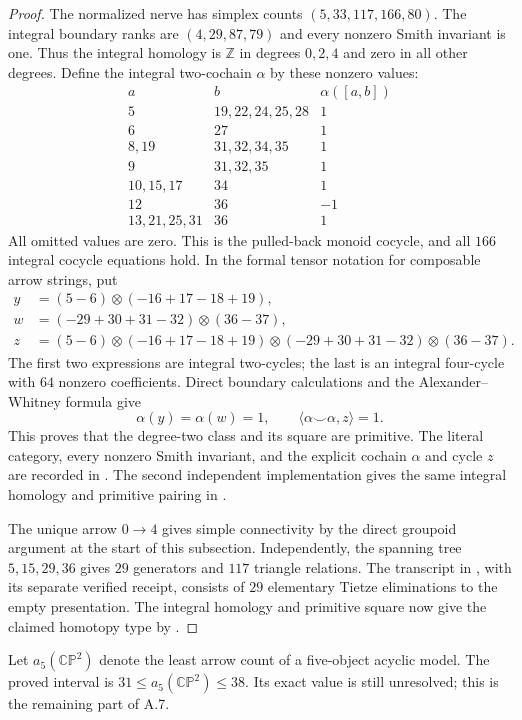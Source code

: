 \begin{proof}
The normalized nerve has simplex counts $(5,33,117,166,80)$.
The integral boundary ranks are $(4,29,87,79)$ and every nonzero
Smith invariant is one. Thus the integral homology is
$\mathbb Z$ in degrees $0,2,4$ and zero in all other degrees.
Define the integral two-cochain $\alpha$ by these nonzero values:
\[
\begin{array}{c|l|r}
a&b&\alpha([a,b])\\\hline
5&19,22,24,25,28&1\\
6&27&1\\
8,19&31,32,34,35&1\\
9&31,32,35&1\\
10,15,17&34&1\\
12&36&-1\\
13,21,25,31&36&1
\end{array}
\]
All omitted values are zero. This is the pulled-back monoid
cocycle, and all $166$ integral cocycle equations hold.
In the formal tensor notation for composable arrow strings, put
\[
\begin{aligned}
y&=(5-6)\otimes(-16+17-18+19),\\
w&=(-29+30+31-32)\otimes(36-37),\\
z&=(5-6)\otimes(-16+17-18+19)
   \otimes(-29+30+31-32)\otimes(36-37).
\end{aligned}
\]
The first two expressions are integral two-cycles; the last is an
integral four-cycle with $64$ nonzero coefficients. Direct boundary
calculations and the Alexander--Whitney formula give
\[
 \alpha(y)=\alpha(w)=1,
 \qquad \langle\alpha\smile\alpha,z\rangle=1.
\]
This proves that the degree-two class and its square are primitive.
The literal category, every nonzero Smith invariant, and the
explicit cochain $\alpha$ and cycle $z$ are recorded in
.
The second independent implementation gives the same integral
homology and primitive pairing in
.

The unique arrow $0\to4$ gives simple connectivity by the direct
groupoid argument at the start of this subsection. Independently,
the spanning tree $5,15,29,36$ gives $29$ generators and $117$
triangle relations. The transcript in
, with its separate verified
receipt, consists of $29$ elementary Tietze eliminations to the
empty presentation. The integral homology and primitive square
now give the claimed homotopy type by
\cite[Proposition~4C.3]{CP2-Hatcher2002}.
\end{proof}

\begin{remark*}
Let $a_5(\mathbb{CP}^2)$ denote the least arrow count of a
five-object acyclic model. The proved interval is
$31\le a_5(\mathbb{CP}^2)\le38$. Its exact value is still
unresolved; this is the remaining part of A.7.
\end{remark*}
